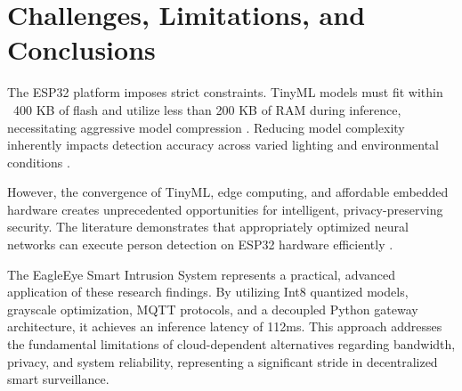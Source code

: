 \documentclass[12pt, a4paper]{article}
\begin{document}
\section{Challenges, Limitations, and Conclusions}
The ESP32 platform imposes strict constraints. TinyML models must fit within ~400 KB of flash and utilize less than 200 KB of RAM during inference, necessitating aggressive model compression \cite{ref15, ref18, ref20}. Reducing model complexity inherently impacts detection accuracy across varied lighting and environmental conditions \cite{ref43}.

However, the convergence of TinyML, edge computing, and affordable embedded hardware creates unprecedented opportunities for intelligent, privacy-preserving security. The literature demonstrates that appropriately optimized neural networks can execute person detection on ESP32 hardware efficiently \cite{ref2, ref15, ref26}.

The EagleEye Smart Intrusion System represents a practical, advanced application of these research findings. By utilizing Int8 quantized models, grayscale optimization, MQTT protocols, and a decoupled Python gateway architecture, it achieves an inference latency of 112ms. This approach addresses the fundamental limitations of cloud-dependent alternatives regarding bandwidth, privacy, and system reliability, representing a significant stride in decentralized smart surveillance.
\end{document}
